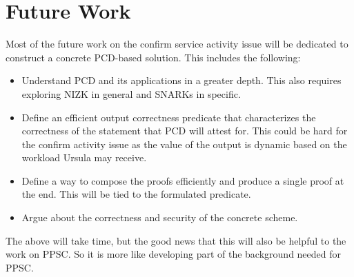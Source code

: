 \section{Future Work}
\label{future-work}
Most of the future work on the confirm service activity issue 
will be dedicated to construct a concrete PCD-based solution. This 
includes the following:
\begin{itemize}
\item Understand PCD and its applications in a greater depth. This 
also requires exploring NIZK in general and SNARKs in specific. 

\item Define an efficient output correctness predicate that characterizes 
the correctness of the statement that PCD will attest for. This could be 
hard for the confirm activity issue as the value of the output is dynamic 
based on the workload Ursula may receive.

\item Define a way to compose the proofs efficiently and produce 
a single proof at the end. This will be tied to the formulated predicate.

\item Argue about the correctness and security of the concrete scheme.
\end{itemize} 


The above will take time, but the good news that this will also be helpful
to the work on PPSC. So it is more like developing part of the
background needed for PPSC.
